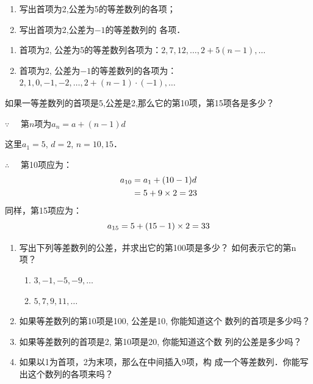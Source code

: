 \begin{example}
\begin{enumerate}
    \item 写出首项为2,公差为5的等差数列的各项；
    \item 写出首项为2,公差为$-1$的等差数列的
各项．
\end{enumerate}    
\end{example}

\begin{solution}
\begin{enumerate}
    \item 首项为2, 公差为5的等差数列各项为：$2, 7, 12, \ldots, 2+5 (n-1) ,\ldots$
    \item 首项为2, 公差为$-1$的等差数列的各项为：
    $2, 1, 0, -1, -2, \ldots, 2+ (n-1)\cdot(-1) ,\ldots$
\end{enumerate}
\end{solution}

\begin{example}
    如果一等差数列的首项是5,公差是2,那么它的第10项，第15项各是多少？
\end{example}

\begin{solution}
   $\because\quad $ 第$n$项为$a_n=a+(n-1)d$

这里$a_1=5$, $d=2$, $n=10, 15$．

$\therefore\quad $ 第10项应为：
\[\begin{split}
    a_{10}&=a_1+ (10-1) d\\
&=5+9\times2=23
\end{split}\]
同样，第15项应为：
\[a_{15}=5+ (15-1) \times2=33\]
\end{solution}

\begin{ex}
\begin{enumerate}
\item 写出下列等差数列的公差，并求出它的第100项是多少？
如何表示它的第n项？
\begin{enumerate}
    \item $3, -1, -5, -9, \ldots$
    \item $5, 7, 9, 11, \ldots$
\end{enumerate} 
\item 如果等差数列的第10项是100, 公差是10, 你能知道这个
数列的首项是多少吗？
\item 如果等差数列的首项是2, 第10项是20, 你能知道这个数
列的公差是多少吗？
\item 如果以1为首项，2为末项，那么在中间插入9项，构
成一个等差数列．你能写出这个数列的各项来吗？
\end{enumerate}
\end{ex}

